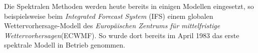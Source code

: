 \begin{refsection}
Die Spektralen Methoden werden heute bereits in einigen Modellen eingesetzt, so beispielsweise beim \textit{Integrated Forecast System} (IFS) einem globalen Wettervorhersage-Modell des \textit{Europäischen Zentrums für mittelfristige Wettervorhersagen}(ECWMF). So wurde dort bereits im April 1983 das erste spektrale Modell in Betrieb genommen.\cite{klima:ecmwf}


\printbibliography[heading=subbibliography]
\end{refsection}